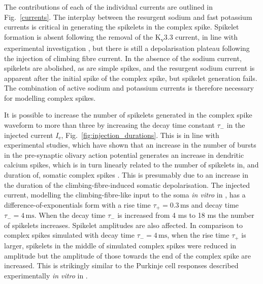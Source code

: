 \documentclass[utf8]{frontiersSCNS} %
\newcommand{\mse}{\,\mathrm{ms}}
\renewcommand{\k}{\mathrm{K}}
\newcommand{\na}{\mathrm{Na}}
\newcommand{\leak}{\mathrm{l}}
\begin{document}
The contributions of each of the individual currents are outlined in
Fig.~\ref{currents}.  The interplay between the resurgent sodium and
fast potassium currents is critical in generating the spikelets in the
complex spike. Spikelet formation is absent following the removal of
the K\textsubscript{v}3.3 current, in line with experimental
investigation \cite{ZaghaEtAl2010}, but there is still a
depolarisation plateau following the injection of climbing fibre
current. In the absence of the sodium current, spikelets are
abolished, as are simple spikes, and the resurgent sodium current is
apparent after the initial spike of the complex spike, but spikelet
generation fails. The combination of active sodium and potassium
currents is therefore necessary for modelling complex spikes.


It is possible to increase the number of spikelets generated in the
complex spike waveform to more than three by increasing the decay time
constant $\tau_-$ in the injected current $I_{\mathrm{e}}$,
Fig.~\ref{fig:injection_durations}. This is in line with experimental
studies, which have shown that an increase in the number of bursts in
the pre-synaptic olivary action potential generates an increase in
dendritic calcium spikes, which is in turn linearly related to the
number of spikelets in, and duration of, somatic complex spikes
\cite{MathyEtAl2009}. This is presumably due to an increase in the
duration of the climbing-fibre-induced somatic depolarisation.  The
injected current, modelling the climbing-fibre-like input to the soma
\textsl{in vitro} in \cite{DavieEtAl2008}, has a
difference-of-exponentials form with a rise time $\tau_+=0.3\mse$ and
decay time $\tau_-=4\mse$. When the decay time $\tau_-$ is increased
from 4 ms to 18 ms the number of spikelets increases. Spikelet
amplitudes are also affected. In comparison to complex spikes
simulated with decay time $\tau_- = 4\mse$, when the rise time
$\tau_+$ is larger, spikelets in the middle of simulated complex
spikes were reduced in amplitude but the amplitude of those towards
the end of the complex spike are increased.  This is strikingly
similar to the Purkinje cell responses described experimentally
\textsl{in vitro} in \cite{MonsivaisEtAl2005}.
\end{document}
